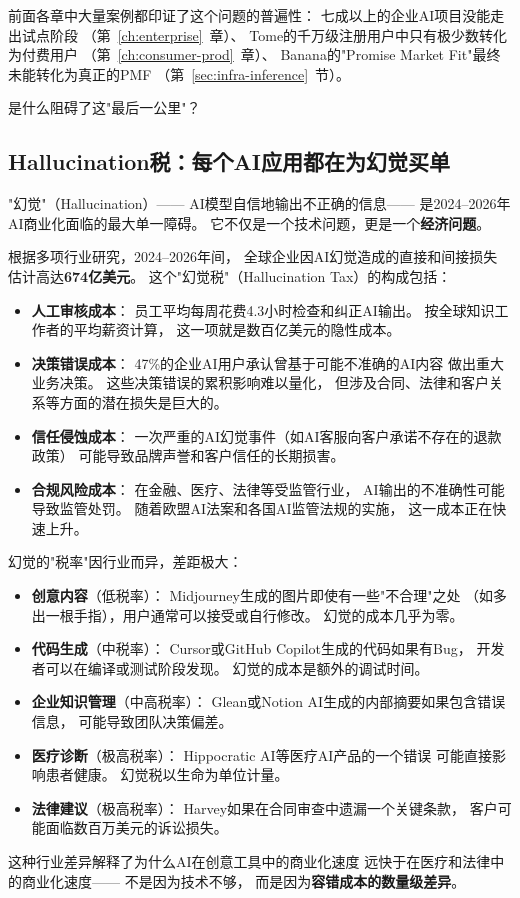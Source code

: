 前面各章中大量案例都印证了这个问题的普遍性：
七成以上的企业AI项目没能走出试点阶段
（第~\ref{ch:enterprise}~章）、
Tome的千万级注册用户中只有极少数转化为付费用户
（第~\ref{ch:consumer-prod}~章）、
Banana的"Promise Market Fit"最终未能转化为真正的PMF
（第~\ref{sec:infra-inference}~节）。

是什么阻碍了这"最后一公里"？

\subsection{Hallucination税：每个AI应用都在为幻觉买单}

"幻觉"（Hallucination）——
AI模型自信地输出不正确的信息——
是2024--2026年AI商业化面临的最大单一障碍。
它不仅是一个技术问题，更是一个\textbf{经济问题}。

根据多项行业研究，2024--2026年间，
全球企业因AI幻觉造成的直接和间接损失
估计高达\textbf{674亿美元}。
这个"幻觉税"（Hallucination Tax）的构成包括：
\begin{itemize}
  \item \textbf{人工审核成本}：
    员工平均每周花费4.3小时检查和纠正AI输出。
    按全球知识工作者的平均薪资计算，
    这一项就是数百亿美元的隐性成本。
  \item \textbf{决策错误成本}：
    47\%的企业AI用户承认曾基于可能不准确的AI内容
    做出重大业务决策。
    这些决策错误的累积影响难以量化，
    但涉及合同、法律和客户关系等方面的潜在损失是巨大的。
  \item \textbf{信任侵蚀成本}：
    一次严重的AI幻觉事件（如AI客服向客户承诺不存在的退款政策）
    可能导致品牌声誉和客户信任的长期损害。
  \item \textbf{合规风险成本}：
    在金融、医疗、法律等受监管行业，
    AI输出的不准确性可能导致监管处罚。
    随着欧盟AI法案和各国AI监管法规的实施，
    这一成本正在快速上升。
\end{itemize}

\begin{warnbox}[幻觉税的行业差异]
幻觉的"税率"因行业而异，差距极大：
\begin{itemize}
  \item \textbf{创意内容}（低税率）：
    Midjourney生成的图片即使有一些"不合理"之处
    （如多出一根手指），用户通常可以接受或自行修改。
    幻觉的成本几乎为零。
  \item \textbf{代码生成}（中税率）：
    Cursor或GitHub Copilot生成的代码如果有Bug，
    开发者可以在编译或测试阶段发现。
    幻觉的成本是额外的调试时间。
  \item \textbf{企业知识管理}（中高税率）：
    Glean或Notion AI生成的内部摘要如果包含错误信息，
    可能导致团队决策偏差。
  \item \textbf{医疗诊断}（极高税率）：
    Hippocratic AI等医疗AI产品的一个错误
    可能直接影响患者健康。
    幻觉税以生命为单位计量。
  \item \textbf{法律建议}（极高税率）：
    Harvey如果在合同审查中遗漏一个关键条款，
    客户可能面临数百万美元的诉讼损失。
\end{itemize}
这种行业差异解释了为什么AI在创意工具中的商业化速度
远快于在医疗和法律中的商业化速度——
不是因为技术不够，
而是因为\textbf{容错成本的数量级差异}。
\end{warnbox}

